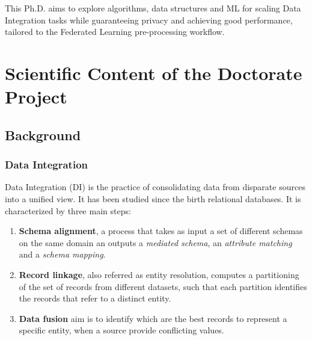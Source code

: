 \documentclass[12pt]{article}
\begin{document}
 This Ph.D. aims to explore algorithms, data structures and ML for scaling Data Integration tasks while guaranteeing privacy and achieving good performance, tailored to the Federated Learning pre-processing workflow.





\section{Scientific Content of the Doctorate Project}
\subsection{Background}
\subsubsection{Data Integration}
Data Integration (DI) is the practice of consolidating data from disparate sources into a unified view. It has been studied since the birth relational databases. 
It is characterized by three main steps: 
\begin{enumerate}
   \item \textbf{Schema alignment}, a process that takes as input a set of different schemas on the same domain an outputs a \textit{mediated schema}, an \textit{attribute matching} and a \textit{schema mapping}.
   \item \textbf{Record linkage}, also referred as entity resolution, computes a partitioning of the set of records from different datasets, such that each partition identifies the records that refer to a distinct entity.
   \item \textbf{Data fusion} aim is to identify which are the best records to represent a specific entity, when a source provide conflicting values.
\end{enumerate}
\end{document}
